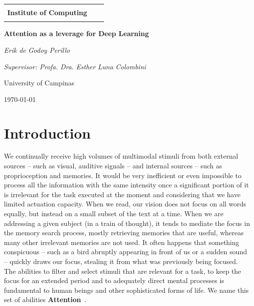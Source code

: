 \documentclass[12pt]{article}
\makeatletter
\def\logos{
  \noindent
  \begin{center}
  \begin{tabular}{ccc}
    \raisebox{-.5\height}{\LogoUnicamp}
    &
    \begin{minipage}{.6\textwidth}
      \centering
      \textbf{\@UNICAMP} \\
      \textbf{Institute of Computing} \\
    \end{minipage}
    &
    \raisebox{-.45\height}{\scalebox{1.11}{\LogoIcUnicampWithName}}
  \end{tabular}
  \end{center}
}
\makeatother
\begin{document}
\begin{titlepage}
    \logos
	\centering
	\vspace{1.5cm}
	{\huge\bfseries Attention as a leverage for Deep Learning\par}
	\vspace{1cm}
	{\itshape Erik de Godoy Perillo\par}
	{\itshape Supervisor: Profa. Dra. Esther Luna Colombini\par}
	\vfill
	University of Campinas
	\vfill
	{\large \today\par}
\end{titlepage}


\begin{abstract}
    Attention is fundamental for intelligent beings.
    It is necessary for filtering the significant volumes of stimuli we constantly receive
    and for applying the adequate mental resources to perform tasks.
    Deep Learning is currently broadly applied to Artificial Intelligence.
    The use of Attention in Deep Learning has been increasingly frequent,
    resulting many times in better results.
    In this context, this work proposes the study and elaboration of approaches
    to use Attention in Deep Learning
    for more power and efficiency to solve problems in Artificial Intelligence.
    We aim at obtaining a framework generically applicable in broad problem classes
    such as Computer Vision, Natural Language Processing, Program Composition and others.
\end{abstract}

\newpage
\tableofcontents
\newpage

\section{Introduction}
We continually receive high volumes of multimodal stimuli from both external sources
-- such as visual, auditive signals -- and internal sources -- such as proprioception and memories.
It would be very inefficient or even impossible to process all the information with
the same intensity once a significant portion of it is irrelevant for
the task executed at the moment and considering that we have limited actuation capacity.
When we read, our vision does not focus on all
words equally, but instead on a small subset of the text at a time.
When we are addressing a given subject (in a train of thought), it tends to mediate the focus
in the memory search process, mostly retrieving memories that
are useful, whereas many other irrelevant memories are not used.
It often happens that something conspicuous
-- such as a bird abruptly appearing in front of us or a sudden sound --
quickly draws our focus, stealing it from what was previously being focused.
The abilities to filter and select stimuli that are relevant for a task, to keep the focus for an
extended period and to adequately direct mental processes is fundamental to
human beings and other sophisticated forms of life.
We name this set of abilities \textbf{Attention}~\cite{ref:esther-thesis}.
\end{document}
